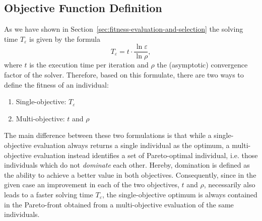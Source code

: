 \subsection{Objective Function Definition}
As we have shown in Section~\ref{sec:fitness-evaluation-and-selection} the solving time $T_{\varepsilon}$ is given by the formula
\begin{equation*}
	T_{\varepsilon} = t \cdot \frac{\ln \varepsilon}{\ln \rho},
\end{equation*}
where $t$ is the execution time per iteration and $\rho$ the (asymptotic) convergence factor of the solver.
Therefore, based on this formulate, there are two ways to define the fitness of an individual:
\begin{enumerate}
	\item Single-objective: $T_{\varepsilon}$
	\item Multi-objective:  $t$ and $\rho$
\end{enumerate}
The main difference between these two formulations is that while a single-objective evaluation always returns a single individual as the optimum, a multi-objective evaluation instead identifies a set of Pareto-optimal individual, i.e. those individuals which do not \emph{dominate} each other.
Hereby, domination is defined as the ability to achieve a better value in both objectives.
Consequently, since in the given case an improvement in each of the two objectives, $t$ and $\rho$, necessarily also leads to a faster solving time $T_{\varepsilon}$, the single-objective optimum is always contained in the Pareto-front obtained from a multi-objective evaluation of the same individuals.

